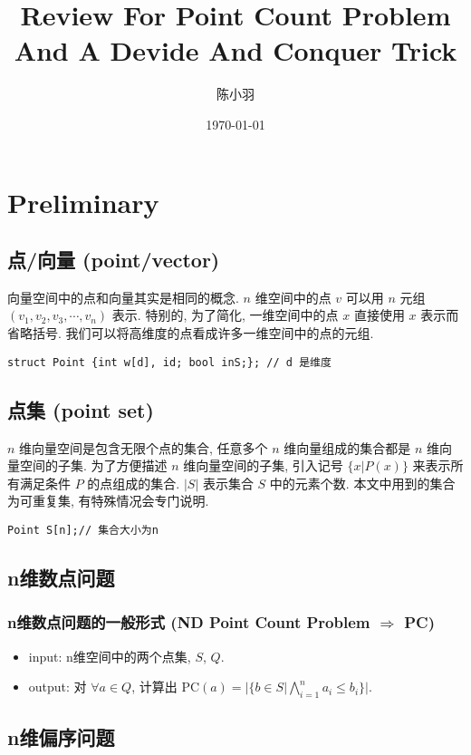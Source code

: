 \documentclass[11pt]{article}
\author{陈小羽}
\date{\today}
\title{Review For Point Count Problem And A Devide And Conquer Trick}
\begin{document}
\maketitle
\tableofcontents


\section{Preliminary}
\label{sec:org0c67775}
\subsection{点/向量 (point/vector)}
\label{sec:orgda6bd24}
向量空间中的点和向量其实是相同的概念.
\(n\) 维空间中的点 \(v\) 可以用 \(n\) 元组 \((v_1, v_2, v_3, \cdots, v_n)\) 表示.
特别的, 为了简化, 一维空间中的点 \(x\) 直接使用 \(x\) 表示而省略括号.
我们可以将高维度的点看成许多一维空间中的点的元组.
\begin{verbatim}
struct Point {int w[d], id; bool inS;}; // d 是维度
\end{verbatim}
\subsection{点集 (point set)}
\label{sec:org10117c3}
\(n\) 维向量空间是包含无限个点的集合, 任意多个 \(n\) 维向量组成的集合都是 \(n\) 维向量空间的子集.
为了方便描述 \(n\) 维向量空间的子集, 引入记号 \(\{ x | P(x)\}\) 来表示所有满足条件 \(P\) 的点组成的集合.
\(|S|\) 表示集合 \(S\) 中的元素个数. 本文中用到的集合为可重复集, 有特殊情况会专门说明.
\begin{verbatim}
Point S[n];// 集合大小为n
\end{verbatim}
\subsection{n维数点问题}
\label{sec:org4054d95}
\subsubsection{n维数点问题的一般形式 (ND Point Count Problem \(\Rightarrow\) PC)}
\label{sec:org3072132}
\begin{itemize}
\item input: n维空间中的两个点集, \(S\), \(Q\).
\item output: 对 \(\forall a \in Q\), 计算出 \(\mbox{PC}(a) = |\{ b\in S| \bigwedge_{i=1}^n a_i\leq b_i\}|\).
\end{itemize}
\subsection{n维偏序问题}
\label{sec:org1626518}
\end{document}
